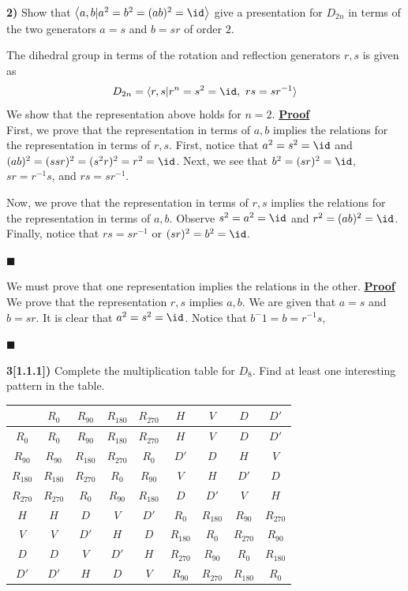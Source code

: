 \documentclass[12pt,a4paper]{article}
\newcommand{\prob}[2]{\textbf{#1)} #2}
\newenvironment{proof}
{
\textbf{\underline{Proof}} \\
}
{
\begin{flushright}
$\blacksquare$
\end{flushright}}
\begin{document}
\prob{2}{Show that $\left<a,b | a^2=b^2=(ab)^2=\id \right>$ give a presentation for $D_{2n}$ in terms of the two generators $a = s$ and $b = sr$ of order $2$.}

The dihedral group in terms of the rotation and reflection generators $r,s$ is given as 
\begin{align*}
D_{2n} = \langle r,s | r^{n} = s^2 = \id,~rs=sr^{-1} \rangle
\end{align*}
We show that the representation above holds for $n = 2$.
\begin{proof}
First, we prove that the representation in terms of $a,b$ implies the relations for the representation in terms of $r,s$. First, notice that $a^2 = s^2 = \id$ and $(ab)^2 = (ssr)^2 = (s^2r)^2 = r^2 = \id$. Next, we see that $b^2 = (sr)^2 = \id$, $sr = r^{-1}s$, and $rs = sr^{-1}$.

Now, we prove that the representation in terms of $r,s$ implies the relations for the representation in terms of $a,b$. Observe $s^2 = a^2 = \id$ and $r^2 = (ab)^2 = \id$. Finally, notice that $rs = sr^{-1}$ or $(sr)^2 = b^2 = \id$.
\end{proof}

We must prove that one representation implies the relations in the other.
\begin{proof}
We prove that the representation $r,s$ implies $a,b$. We are given that $a = s$ and $b = sr$. It is clear that $a^2 = s^2 = \id$. Notice that $b^-1 = b = r^{-1}s$, 
\end{proof}

\prob{3[1.1.1]}{Complete the multiplication table for $D_8$. Find at least one interesting pattern in the table.}

\begin{table}[H]
 \begin{center}
  \begin{tabular}{c|cccccccc}
    & $R_{0}$ & $R_{90}$ & $R_{180}$ & $R_{270}$ & $H$ & $V$ & $D$ & $D'$ \\
  \hline
  $R_{0}$ & $R_{0}$ & $R_{90}$ & $R_{180}$ & $R_{270}$ & $H$ & $V$ & $D$ & $D'$ \\ 
  $R_{90}$ & $R_{90}$ & $R_{180}$ & $R_{270}$ & $R_{0}$ & $D'$ & $D$ & $H$ & $V$ \\
  $R_{180}$ & $R_{180}$ & $R_{270}$ & $R_{0}$ & $R_{90}$ & $V$ & $H$ & $D'$ & $D$ \\
  $R_{270}$ & $R_{270}$ & $R_{0}$ & $R_{90}$ & $R_{180}$ & $D$ & $D'$ & $V$ & $H$ \\
  $H$ & $H$ & $D$ & $V$ & $D'$ & $R_{0}$ & $R_{180}$ & $R_{90}$ & $R_{270}$ \\
  $V$ & $V$ & $D'$ & $H$ & $D$ & $R_{180}$ & $R_{0}$ & $R_{270}$ & $R_{90}$ \\
  $D$ & $D$ & $V$ & $D'$ & $H$ & $R_{270}$ & $R_{90}$ & $R_{0}$ & $R_{180}$ \\
  $D'$ & $D'$ & $H$ & $D$ & $V$ & $R_{90}$ & $R_{270}$ & $R_{180}$ & $R_{0}$ \\
  \end{tabular}
 \end{center}
\end{table}
\end{document}
